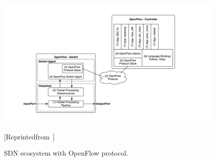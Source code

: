 \begin{figure}[t]
  \begin{minipage}{\textwidth}
      \centering
      \includegraphics[width=1\textwidth]{figures/OpenFlow.pdf}
      \caption[SDN ecosystem with OpenFlow protocol.]{SDN ecosystem with OpenFlow protocol.}{[Reprinted\space from\space \textsuperscript{\cite{flowgrammable}}]}
      \label{fig:OpenFlow}
  \end{minipage}  
\end{figure}
